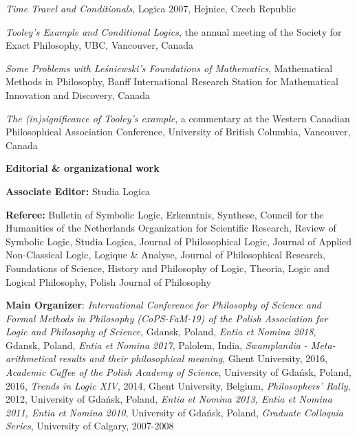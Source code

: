 \documentclass[10pt, a4paper]{article}
\newcommand{\years}[1]{\marginnote{\normalsize #1}}
\begin{document}
 \emph{Time Travel and Conditionals},   Logica 2007,   Hejnice, Czech Republic





\vspace{0.5mm}


  \emph{Tooley's Example and Conditional Logics}, the annual meeting of the Society for Exact Philosophy,      UBC, Vancouver, Canada



\vspace{0.5mm}


 \emph{Some Problems with Le\'sniewski's Foundations of Mathematics},  Mathematical  Methods in Philosophy,  Banff
International Research Station for Mathematical Innovation and Discovery, Canada


\vspace{0.5mm}


\years{2006} \emph{The (in)significance of Tooley's example}, a commentary at the   Western Canadian Philosophical Association Conference,  University of British Columbia, Vancouver, Canada


\vspace{0.5mm}



\large {\sc \textbf{Editorial \& organizational work}}\normalsize \hspace{5mm}


\normalsize


\textbf{Associate Editor:} Studia Logica

\textbf{Referee:} Bulletin of Symbolic Logic, Erkenntnis,  Synthese, Council for the Humanities of the Netherlands Organization for Scientific Research, Review of Symbolic Logic,  Studia Logica,  Journal of Philosophical Logic, Journal of Applied Non-Classical Logic,  Logique \& Analyse,   Journal of Philosophical Research,  Foundations of Science,  History and Philosophy of Logic, Theoria, Logic and Logical Philosophy, Polish Journal of Philosophy



\textbf{Main Organizer}: \emph{International Conference for Philosophy of Science and Formal Methods in Philosophy (CoPS-FaM-19) of the Polish Association for Logic and Philosophy of Science}, Gdansk, Poland, \emph{Entia et Nomina 2018}, Gdansk, Poland,  \emph{Entia et Nomina 2017}, Palolem, India, \emph{Swamplandia - Meta-arithmetical results and their philosophical meaning}, Ghent University, 2016, \emph{Academic Caffee of the Polish Academy of Science}, University of Gda{\'n}sk, Poland, 2016, \emph{Trends in Logic XIV}, 2014, Ghent University, Belgium, \emph{Philosophers' Rally}, 2012, University of Gda\' nsk, Poland, \emph{Entia et Nomina 2013, Entia et Nomina 2011, Entia et Nomina 2010}, University of Gda{\'n}sk, Poland,  \emph{Graduate Colloquia Series}, University of Calgary, 2007-2008





%


%
\end{document}
